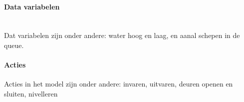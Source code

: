 \documentclass{article}
\begin{document}
	
	
	
	\paragraph{Data variabelen} \\
	Dat variabelen zijn onder andere: water hoog  en laag, en aanal schepen in de queue.
	\paragraph{Acties}
	Acties in het model zijn onder andere: invaren, uitvaren, deuren openen en sluiten, nivelleren
	
 
%	
%	
\end{document}
